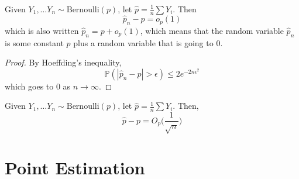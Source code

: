 \documentclass{article}
\begin{document}
    \begin{theorem}
    Given $Y_1, \ldots Y_n \sim \mathrm{Bernoulli}(p)$, let $\widehat{p} = \frac{1}{n} \sum Y_i$. Then 
    \[\widehat{p}_n - p = o_p (1)\]
    which is also written $\widehat{p}_n = p + o_p (1)$, which means that the random variable $\widehat{p}_n$ is some constant $p$ plus a random variable that is going to $0$. 
    \end{theorem}
    \begin{proof}
    By Hoeffding's inequality, 
    \[\mathbb{P}(| \widehat{p}_n - p | > \epsilon) \leq 2 e^{-2n \epsilon^2}\]
    which goes to $0$ as $n \rightarrow \infty$. 
    \end{proof}

    \begin{example}
    Given $Y_1, \ldots Y_n \sim \mathrm{Bernoulli}(p)$, let $\widehat{p} = \frac{1}{n} \sum Y_i$. Then, 
    \[\widehat{p} - p = O_p \Big( \frac{1}{\sqrt{n}} \Big)\]
    \end{example}

\section{Point Estimation}
\end{document}

